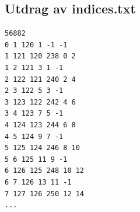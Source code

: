 \documentclass[norsk, doc, 11pt, a4paper]{apa7}  %
\begin{document}
\subsection{Utdrag av indices.txt} \label{ap:idx}
\begin{verbatim}
56882
0 1 120 1 -1 -1
1 121 120 238 0 2
1 2 121 3 1 -1
2 122 121 240 2 4
2 3 122 5 3 -1
3 123 122 242 4 6
3 4 123 7 5 -1
4 124 123 244 6 8
4 5 124 9 7 -1
5 125 124 246 8 10
5 6 125 11 9 -1
6 126 125 248 10 12
6 7 126 13 11 -1
7 127 126 250 12 14
...
\end{verbatim}
\end{document}
